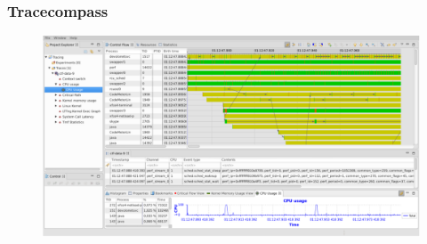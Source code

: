 \begin{frame}[fragile]
    \frametitle{Tracecompass}

% 
  \begin{figure}
    \centering
    \includegraphics[width=0.8\linewidth]{figs/trace-tracecompass.png}
	\end{figure}

\end{frame}

